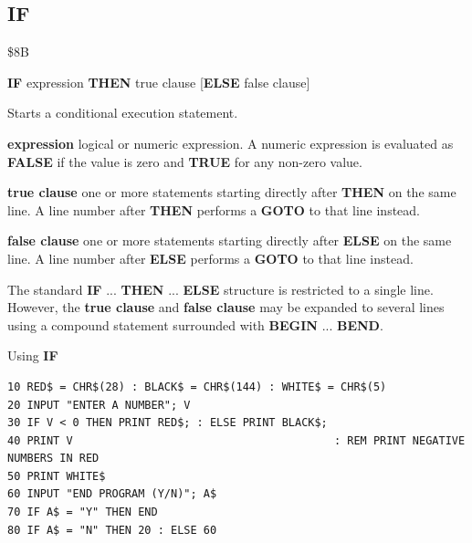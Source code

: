 \subsection{IF}
\begin{description}[leftmargin=2cm,style=nextline]
\item [Token:]    \$8B

\item [Format:]   {\bf IF} expression {\bf THEN} true clause [{\bf ELSE} false clause]

\item [Usage:]    Starts a conditional execution statement.

                  {\bf expression} logical or numeric expression. A numeric expression is evaluated as {\bf FALSE} if the value is zero and {\bf TRUE} for any non-zero value.

                  {\bf true clause} one or more statements starting directly after {\bf THEN} on the same line. A line number after {\bf THEN} performs a {\bf GOTO} to that line instead.

                  {\bf false clause} one or more statements starting directly after {\bf ELSE} on the same line. A line number after {\bf ELSE} performs a {\bf GOTO} to that line instead.

\item [Remarks:]  The standard {\bf IF} ... {\bf THEN} ... {\bf ELSE} structure is restricted to a single line. However, the {\bf true clause} and {\bf false clause} may be expanded to several lines using a compound statement surrounded with {\bf BEGIN} ... {\bf BEND}.

\item [Example:]  Using {\bf IF}

\begin{tcolorbox}[colback=black,coltext=white]
\verbatimfont{\codefont}
\begin{verbatim}
10 RED$ = CHR$(28) : BLACK$ = CHR$(144) : WHITE$ = CHR$(5)
20 INPUT "ENTER A NUMBER"; V
30 IF V < 0 THEN PRINT RED$; : ELSE PRINT BLACK$;
40 PRINT V                                        : REM PRINT NEGATIVE NUMBERS IN RED
50 PRINT WHITE$
60 INPUT "END PROGRAM (Y/N)"; A$
70 IF A$ = "Y" THEN END
80 IF A$ = "N" THEN 20 : ELSE 60
\end{verbatim}
\end{tcolorbox}
\end{description}


